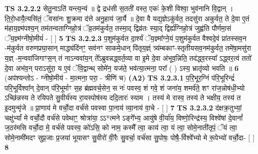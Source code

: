 \documentclass[17pt]{extarticle}
\begin{document}
                  \newline
                                \textbf{ TS 3.2.2.2} \newline
                  सेतु॒नाऽति॑ यन्त्य॒न्यं ॥ द्वे द्रध॑सी स॒तती॑ वस्त॒ एकः॑ के॒शी विश्वा॒ भुव॑नानि वि॒द्वान् । ति॒रो॒धायै॒त्यसि॑तं॒ ॅवसा॑नः शु॒क्रमा द॑त्ते अनु॒हाय॑ जा॒र्यै ॥ दे॒वा वै यद्य॒ज्ञेऽकु॑र्वत॒ तदसु॑रा अकुर्वत॒ ते दे॒वा ए॒तं म॑हाय॒ज्ञ्म॑पश्य॒न् तम॑तन्वताग्निहो॒त्रं ॅव्र॒तम॑कुर्वत॒ तस्मा॒द् द्विव्र॑तः स्या॒द् द्विर्ह्य॑ग्निहो॒त्रं जुह्व॑ति पौर्णमा॒सं ॅय॒ज्ञ्म॑ग्नीषो॒मीयं॑ - [  ] \textbf{  5} \newline
                  \newline
                                \textbf{ TS 3.2.2.3} \newline
                  प॒शुम॑कुर्वत दा॒र्श्यं ॅय॒ज्ञ्मा᳚ग्ने॒यं प॒शुम॑कुर्वत वैश्वदे॒वं प्रा॑तस्सव॒न -म॑कुर्वत वरुणप्रघा॒सान् माद्ध्य॑दिंनꣳ॒॒ सव॑नꣳ साकमे॒धान् पि॑तृय॒ज्ञ्ं त्र्य॑म्बकाꣳ-स्तृतीयसव॒नम॑कुर्वत॒ तमे॑षा॒मसु॑रा य॒ज्ञ् -म॒न्ववा॑जिगाꣳस॒न् तं नाऽन्ववा॑य॒न् ते᳚ऽब्रुवन्नद्ध्वर्त॒व्या वा इ॒मे दे॒वा अ॑भूव॒न्निति॒ तद॑द्ध्व॒रस्या᳚ ऽद्ध्वर॒त्वं ततो॑ दे॒वा अभ॑व॒न् पराऽसु॑रा॒ य ए॒वं ॅवि॒द्वान्थ् सोमे॑न॒ यज॑ते॒ भव॑त्या॒त्मना॒ परा᳚ ( ) ऽस्य॒ भ्रातृ॑व्यो भवति ॥ \textbf{  6 } \newline
                  \newline
                      (अप॑श्यन्तोऽ - ग्नीषो॒मीय॑ - मा॒त्मना॒ परा॒ - त्रीणि॑ च)  \textbf{(A2)} \newline \newline
                                        \textbf{ TS 3.2.3.1} \newline
                  प॒रि॒भूर॒ग्निं प॑रि॒भूरिन्द्रं॑ परि॒भूर्विश्वा᳚न् दे॒वान् प॑रि॒भूर्माꣳ स॒ह ब्र॑ह्मवर्च॒सेन॒ स नः॑ पवस्व॒ शं गवे॒ शं जना॑य॒ शमर्व॑ते॒ शꣳ रा॑ज॒न्नोष॑धी॒भ्यो ऽच्छि॑न्नस्य ते रयिपते सु॒वीर्य॑स्य रा॒यस्पोष॑स्य ददि॒तारः॑ स्याम । तस्य॑ मे रास्व॒ तस्य॑ ते भक्षीय॒ तस्य॑ त इ॒दमुन्मृ॑जे ॥ प्रा॒णाय॑ मे वर्चो॒दा वर्च॑से पवस्वा पा॒नाय॑ व्या॒नाय॑ वा॒चे - [  ] \textbf{  7} \newline
                  \newline
                                \textbf{ TS 3.2.3.2} \newline
                  द॑क्षक्र॒तुभ्यां॒ चक्षु॑र्भ्यां मे वर्चो॒दौ वर्च॑से पवेथाꣳ॒॒ श्रोत्रा॑या॒ ऽऽ*त्मने ऽङ्गे᳚भ्य॒ आयु॑षे वी॒र्या॑य॒ विष्णो॒रिन्द्र॑स्य॒ विश्वे॑षां दे॒वानां᳚ ज॒ठर॑मसि वर्चो॒दा मे॒ वर्च॑से पवस्व॒ को॑ऽसि॒ को नाम॒ कस्मै᳚ त्वा॒ काय॑ त्वा॒ यं त्वा॒ सोमे॒नाती॑तृपं॒ ॅयं त्वा॒ सोमे॒नामी॑मदꣳ सुप्र॒जाः प्र॒जया॑ भूयासꣳ सु॒वीरो॑ वी॒रैः सु॒वर्चा॒ वर्च॑सा सु॒पोषः॒ पोषै॒-र्विश्वे᳚भ्यो मे रू॒पेभ्यो॑ वर्चो॒दा- [  ] \textbf{  8} \newline
\end{document}
